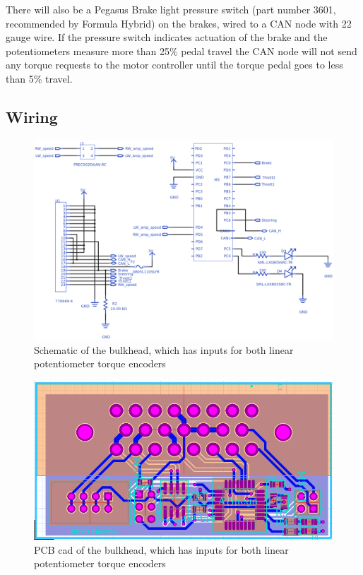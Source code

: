 \documentclass{article}
\begin{document}
        There will also be a Pegasus Brake light pressure switch (part number 3601, recommended by Formula Hybrid) on the brakes, wired to a CAN node with 22 gauge wire. If the pressure switch indicates actuation of the brake and the potentiometers measure more than 25\% pedal travel the CAN node will not send any torque requests to the motor controller until the torque pedal goes to less than 5\% travel.

    \subsection{Wiring}


        \begin{figure}[H]
            \centering
            \includegraphics[width = 0.7 \textwidth]{Bulkheadschem}
            \caption{Schematic of the bulkhead, which has inputs for both linear potentiometer torque encoders}
            \label{bulkheadschem}
        \end{figure}

        \begin{figure}[H]
            \centering
            \includegraphics[width = 0.7 \textwidth]{bulkhead}
            \caption{PCB cad of the bulkhead, which has inputs for both linear potentiometer torque encoders}
            \label{bulkheadPCB}
        \end{figure}
\end{document}
